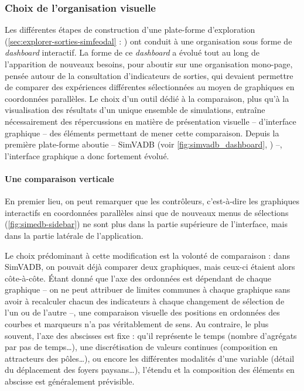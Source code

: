 		\subsubsection{Choix de l'organisation visuelle}
		
		Les différentes étapes de construction d'une plate-forme d'exploration (\cref{sec:explorer-sorties-simfeodal} : ) ont conduit à une organisation sous forme de \textit{dashboard} interactif.
		La forme de ce \textit{dashboard} a évolué tout au long de l'apparition de nouveaux besoins, pour aboutir sur une organisation mono-page, pensée autour de la consultation d'indicateurs de sorties, qui devaient permettre de comparer des expériences différentes sélectionnées au moyen de graphiques en coordonnées parallèles.
		Le choix d'un outil dédié à la comparaison, plus qu'à la visualisation des résultats d'un unique ensemble de simulations, entraîne nécessairement des répercussions en matière de présentation visuelle -- d'interface graphique -- des éléments permettant de mener cette comparaison.
		Depuis la première plate-forme aboutie -- SimVADB (voir \cref{fig:simvadb_dashboard}, ) --, l'interface graphique a donc fortement évolué.
		
			\paragraph*{Une comparaison verticale}
			
			En premier lieu, on peut remarquer que les \og contrôleurs\fg{}, c'est-à-dire les graphiques interactifs en coordonnées parallèles ainsi que de nouveaux menus de sélections (\cref{fig:simedb-sidebar}) ne sont plus dans la partie supérieure de l'interface, mais dans la partie latérale de l'application.
			
			Le choix prédominant à cette modification est la volonté de comparaison : dans SimVADB, on pouvait déjà comparer deux graphiques, mais ceux-ci étaient alors côte-à-côte.
			Étant donné que l'axe des ordonnées est dépendant de chaque graphique -- on ne peut attribuer de limites communes à chaque graphique sans avoir à recalculer chacun des indicateurs à chaque changement de sélection de l'un ou de l'autre --, une comparaison visuelle des positions en ordonnées des courbes et marqueurs n'a pas véritablement de sens.
			Au contraire, le plus souvent, l'axe des abscisses est fixe : qu'il représente le temps (nombre d'agrégats par pas de temps\ldots), une discrétisation de valeurs continues (composition en attracteurs des pôles\ldots), ou encore les différentes modalités d'une variable (détail du déplacement des foyers paysans\ldots), l'étendu et la composition des éléments en abscisse est généralement prévisible.
			
